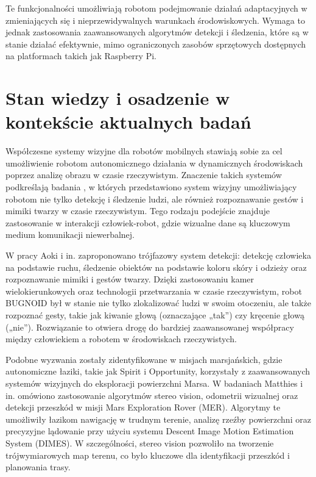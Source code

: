 \documentclass[a4paper,twoside,12pt]{book}
\begin{document}
Te funkcjonalności umożliwiają robotom podejmowanie działań adaptacyjnych w zmieniających się i nieprzewidywalnych warunkach środowiskowych. Wymaga to jednak zastosowania zaawansowanych algorytmów detekcji i śledzenia, które są w stanie działać efektywnie, mimo ograniczonych zasobów sprzętowych dostępnych na platformach takich jak Raspberry Pi.

\newpage

\section{Stan wiedzy i osadzenie w kontekście aktualnych badań}
Współczesne systemy wizyjne dla robotów mobilnych stawiają sobie za cel umożliwienie robotom autonomicznego działania w dynamicznych środowiskach poprzez analizę obrazu w czasie rzeczywistym. Znaczenie takich systemów podkreślają badania \cite{bib:aoki2001realtime}, w których przedstawiono system wizyjny umożliwiający robotom nie tylko detekcję i śledzenie ludzi, ale również rozpoznawanie gestów i mimiki twarzy w czasie rzeczywistym. Tego rodzaju podejście znajduje zastosowanie w interakcji człowiek-robot, gdzie wizualne dane są kluczowym medium komunikacji niewerbalnej.

W pracy Aoki i in. \cite{bib:aoki2001realtime} zaproponowano trójfazowy system detekcji: detekcję człowieka na podstawie ruchu, śledzenie obiektów na podstawie koloru skóry i odzieży oraz rozpoznawanie mimiki i gestów twarzy. Dzięki zastosowaniu kamer wielokierunkowych oraz technologii przetwarzania w czasie rzeczywistym, robot BUGNOID był w stanie nie tylko zlokalizować ludzi w swoim otoczeniu, ale także rozpoznać gesty, takie jak kiwanie głową (oznaczające „tak”) czy kręcenie głową („nie”). Rozwiązanie to otwiera drogę do bardziej zaawansowanej współpracy między człowiekiem a robotem w środowiskach rzeczywistych.

Podobne wyzwania zostały zidentyfikowane w misjach marsjańskich, gdzie autonomiczne łaziki, takie jak Spirit i Opportunity, korzystały z zaawansowanych systemów wizyjnych do eksploracji powierzchni Marsa. W badaniach Matthies i in. \cite{bib:matthies2007mars} omówiono zastosowanie algorytmów stereo vision, odometrii wizualnej oraz detekcji przeszkód w misji Mars Exploration Rover (MER). Algorytmy te umożliwiły łazikom nawigację w trudnym terenie, analizę rzeźby powierzchni oraz precyzyjne lądowanie przy użyciu systemu Descent Image Motion Estimation System (DIMES). W szczególności, stereo vision pozwoliło na tworzenie trójwymiarowych map terenu, co było kluczowe dla identyfikacji przeszkód i planowania trasy.
\end{document}
